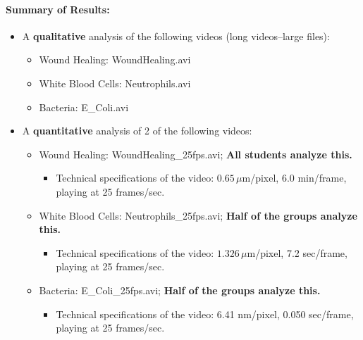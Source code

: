 \paragraph{ Summary of Results:}
\begin{itemize}
\item A \textbf{qualitative} analysis of the following videos (long videos--large files):
	\begin{itemize}
	\item Wound Healing: WoundHealing.avi
	\item White Blood Cells: Neutrophils.avi
	\item Bacteria: E\_Coli.avi
	\end{itemize}
\item A \textbf{quantitative} analysis of 2 of the following videos:
	\begin{itemize}
	\item Wound Healing: WoundHealing\_25fps.avi; \textbf{All students analyze this.}
		\begin{itemize}
		\item Technical specifications of the video: $0.65 \, \mu$m/pixel, 6.0 min/frame, playing at 25 frames/sec.
		\end{itemize}
	\item White Blood Cells: Neutrophils\_25fps.avi; \textbf{Half of the groups analyze this.}
		\begin{itemize}
		\item Technical specifications of the video: $1.326 \, \mu$m/pixel, 7.2 sec/frame, playing at 25 frames/sec.
		\end{itemize}
	\item Bacteria: E\_Coli\_25fps.avi; \textbf{Half of the groups analyze this.}
		\begin{itemize}
		\item Technical specifications of the video: 6.41 nm/pixel, 0.050 sec/frame, playing at 25 frames/sec.
		\end{itemize}
	\end{itemize}
\end{itemize}

